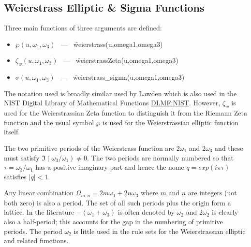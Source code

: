 \subsection{Weierstrass Elliptic \& Sigma Functions}
Three main functions of three arguments are defined:
\hypertarget{WEIERSTRASS}{}
\hypertarget{WEIERSTRASSZETA}{}
\hypertarget{SIGMA}{}
\hypertarget{operator:WEIERSTRASS_SIGMA}{}
\hypertarget{operator:WEIERSTRASS}{}
\hypertarget{operator:WEIERSTRASSZETA}{}
\begin{itemize}
\item  $\wp(u, \omega_1, \omega_3)$ \ --- \ \f{weierstrass(u,omega1,omega3)}
\item $\zeta_w(u, \omega_1, \omega_3)$ \ --- \ \f{weierstrassZeta(u,omega1,omega3)}
\item $\sigma(u, \omega_1, \omega_3)$ \ --- \ \f{weierstrass\_sigma(u,omega1,omega3)}
\end{itemize}

The notation used is broadly similar used by Lawden \cite{Lawden:89} which is also used in the
NIST Digital Library of Mathematical Functions \href{https://dlmf.nist.gov/}{DLMF:NIST}. However,
$\zeta_w$ is used for the Weierstrassian Zeta function to distinguish it from the Riemann Zeta
function and the usual symbol $\wp$ is used for the Weierstrassian elliptic function itself.

The two primitive periods of the Weierstrass function are $2\omega_1$ and $2\omega_3$ and these must satisfy
$\Im(\omega_3/\omega_1) \neq 0$. The two periods are normally numbered so that $\tau = \omega_3/\omega_1$ has
a positive imaginary part and hence the nome $q = exp(i\pi\tau)$ satisfies $|q| <1$.

Any linear combination $\Omega_{m,n} = 2m\omega_1 +2n\omega_3$ where $m$ and $n$ are
integers (not both zero) is also a period. The set of all such periods plus the origin form a lattice. In the literature
$-(\omega_1+\omega_3)$ is often denoted by $\omega_2$ and $2\omega_2$ is clearly also a half-period; this
accounts for the gap in the numbering of primitive periods. The period $\omega_2$ is little used in the \REDUCE rule sets for
the Weierstrassian elliptic and related functions.

